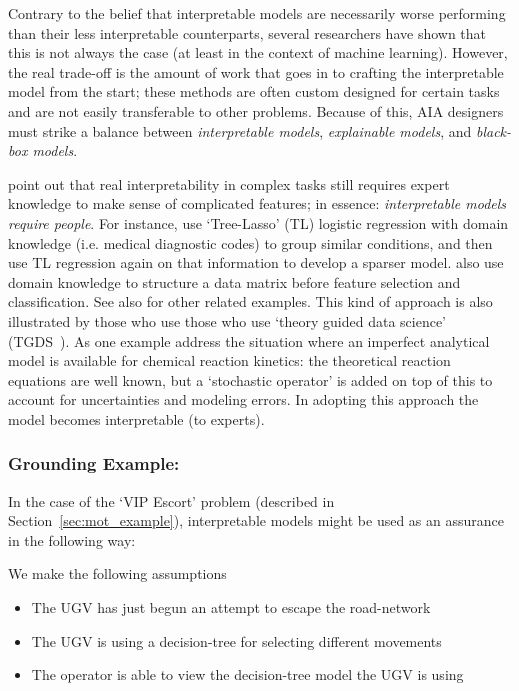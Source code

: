 Contrary to the belief that interpretable models are necessarily worse performing than their less interpretable counterparts, several researchers have shown that this is not always the case (at least in the context of machine learning). However, the real trade-off is the amount of work that goes in to crafting the interpretable model from the start; these methods are often custom designed for certain tasks and are not easily transferable to other problems. Because of this, AIA designers must strike a balance between \emph{interpretable models}, \emph{explainable models}, and \emph{black-box models}.

\citet{Park2016-ld} point out that real interpretability in complex tasks still requires expert knowledge to make sense of complicated features; in essence: \emph{interpretable models require people}. For instance, \citet{Jovanovic2016-gw} use `Tree-Lasso' (TL) logistic regression with domain knowledge (i.e. medical diagnostic codes) to group similar conditions, and then use TL regression again on that information to develop a sparser model. \citet{Zycinski2012-jj} also use domain knowledge to structure a data matrix before feature selection and classification. See also \citet{Zhang2018-no,Khoa2018-gh} for other related examples. 
%
This kind of approach is also illustrated by those who use those who use `theory guided data science' (TGDS~\cite{Kumar2016-yw,Faghmous2014-og}). As one example \citet{Morrison2016-fz} address the situation where an imperfect analytical model is available for chemical reaction kinetics: the theoretical reaction equations are well known, but a `stochastic operator' is added on top of this to account for uncertainties and modeling errors. In adopting this approach the model becomes interpretable (to experts).

\subsubsection{Grounding Example:}
In the case of the `VIP Escort' problem (described in Section~\ref{sec:mot_example}), interpretable models might be used as an assurance in the following way:

We make the following assumptions

\begin{itemize}
    \item The UGV has just begun an attempt to escape the road-network
    \item The UGV is using a decision-tree for selecting different movements
    \item The operator is able to view the decision-tree model the UGV is using
\end{itemize}

